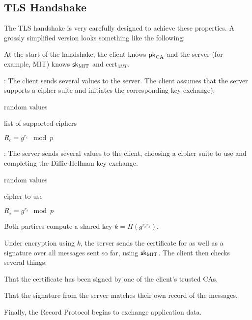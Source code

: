 \subsection{TLS Handshake}
The TLS handshake is very carefully designed to achieve these properties. A grossly simplified version looks something like the following:

\begin{compactenum}
\item At the start of the handshake, the client knows $\mathsf{pk}_{\text{CA}}$ and the server (for example, MIT) knows ${\mathsf{sk}}_\text{MIT}$ and $\text{cert}_{MIT}$.
\item {}: The client sends several values to the server. The client assumes that the server supports a cipher suite and initiates the corresponding key exchange):
	\begin{compactitem}
		\item random values
		\item list of supported ciphers
		\item $R_c = g^{r_c} \mod p$
	\end{compactitem}
\item {}: The server sends several values to the client, choosing a cipher suite to use and completing the Diffie-Hellman key exchange. 
	\begin{compactitem}
		\item random values
		\item cipher to use
		\item $R_s = g^{r_s} \mod p$
	\end{compactitem}
\item Both partices compute a shared key $k = H(g^{r_c r_s})$.
\item Under encryption using $k$, the server sends the certificate for  as well as a signature over all messages sent so far, using ${\mathsf{sk}}_\text{MIT}$. The client then checks several things:
	\begin{compactitem}
	\item That the certificate has been signed by one of the client's trusted CAs.
	\item That the signature from the server matches their own record of the messages.
	\end{compactitem}
\item Finally, the Record Protocol begins to exchange application data.
\end{compactenum}

